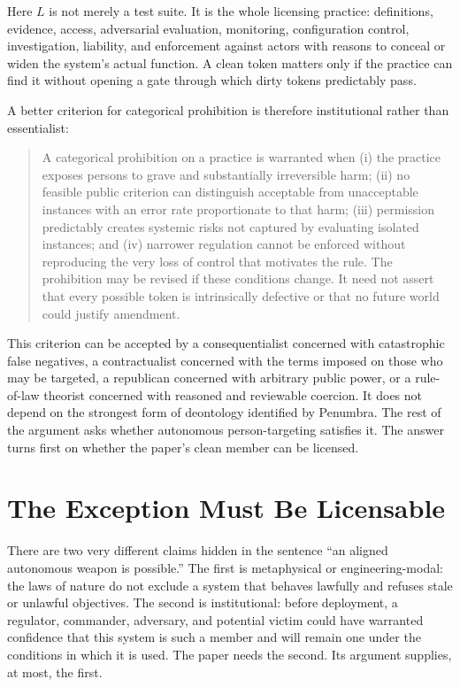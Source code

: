 \documentclass[11pt]{article}
\begin{document}
Here $L$ is not merely a test suite. It is the whole licensing practice: definitions, evidence, access, adversarial evaluation, monitoring, configuration control, investigation, liability, and enforcement against actors with reasons to conceal or widen the system's actual function. A clean token matters only if the practice can find it without opening a gate through which dirty tokens predictably pass.

A better criterion for categorical prohibition is therefore institutional rather than essentialist:

\begin{quote}
A categorical prohibition on a practice is warranted when (i) the practice exposes persons to grave and substantially irreversible harm; (ii) no feasible public criterion can distinguish acceptable from unacceptable instances with an error rate proportionate to that harm; (iii) permission predictably creates systemic risks not captured by evaluating isolated instances; and (iv) narrower regulation cannot be enforced without reproducing the very loss of control that motivates the rule. The prohibition may be revised if these conditions change. It need not assert that every possible token is intrinsically defective or that no future world could justify amendment.
\end{quote}

This criterion can be accepted by a consequentialist concerned with catastrophic false negatives, a contractualist concerned with the terms imposed on those who may be targeted, a republican concerned with arbitrary public power, or a rule-of-law theorist concerned with reasoned and reviewable coercion. It does not depend on the strongest form of deontology identified by Penumbra. The rest of the argument asks whether autonomous person-targeting satisfies it. The answer turns first on whether the paper's clean member can be licensed.

\section{The Exception Must Be Licensable}
\label{sec:licensable}

There are two very different claims hidden in the sentence ``an aligned autonomous weapon is possible.'' The first is metaphysical or engineering-modal: the laws of nature do not exclude a system that behaves lawfully and refuses stale or unlawful objectives. The second is institutional: before deployment, a regulator, commander, adversary, and potential victim could have warranted confidence that this system is such a member and will remain one under the conditions in which it is used. The paper needs the second. Its argument supplies, at most, the first.
\end{document}
